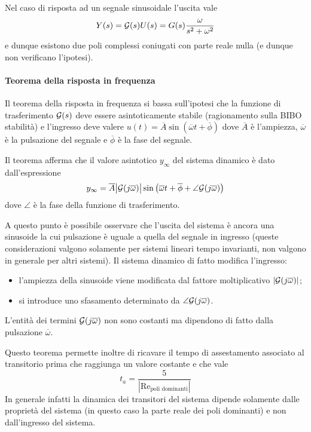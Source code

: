 		Nel caso di risposta ad un segnale sinusoidale l'uscita vale
		\[Y(s) = \mathcal G(s) U(s) = G(s) \frac{\omega}{s^2+\omega^2}\]
		e dunque esistono due poli complessi coniugati con parte reale nulla (e dunque non verificano l'ipotesi).
		
		\paragraph{Teorema della risposta in frequenza} Il teorema della risposta in frequenza si bassa sull'ipotesi che la funzione di trasferimento $\mathcal G(s)$ deve essere asintoticamente stabile (ragionamento sulla BIBO stabilità) e l'ingresso deve valere $u(t) = \overline A \sin(\overline \omega t + \overline \phi)$ dove $\overline A$ è l'ampiezza, $\overline \omega$ è la pulsazione del segnale e $\overline \phi$ è la fase del segnale.
		
		Il teorema afferma che il valore asintotico $y_\infty$ del sistema dinamico è dato dall'espressione
		\begin{equation}
			y_\infty = \overline A \big|\mathcal G(j\overline \omega)\big| \sin \left(\overline \omega t + \overline \phi + \angle \mathcal G(j\overline \omega)\right)
		\end{equation}
		dove $\angle$ è la fase della funzione di trasferimento.
		
		
		A questo punto è possibile osservare che l'uscita del sistema è ancora una sinusoide la cui pulsazione è uguale a quella del segnale in ingresso (queste considerazioni valgono solamente per sistemi lineari tempo invarianti, non valgono in generale per altri sistemi). Il sistema dinamico di fatto modifica l'ingresso:
		\begin{itemize}
			\item l'ampiezza della sinusoide viene modificata dal fattore moltiplicativo $|\mathcal G(j\overline \omega)|$;
			\item si introduce uno sfasamento determinato da $\angle \mathcal G(j\overline \omega)$.
		\end{itemize}
		L'entità dei termini $\mathcal G(j\overline \omega)$ non sono costanti ma dipendono di fatto dalla pulsazione $\overline \omega$.
		
		Questo teorema permette inoltre di ricavare il tempo di assestamento associato al transitorio prima che raggiunga un valore costante e che vale
		\[t_a = \frac 5 {|\textrm{Re}_\textrm{poli dominanti}|}\]
		In generale infatti la dinamica dei transitori del sistema dipende solamente dalle proprietà del sistema (in questo caso la parte reale dei poli dominanti) e non dall'ingresso del sistema.
		
